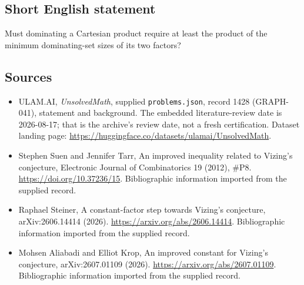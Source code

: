 \documentclass[11pt,a4paper]{article}
\begin{document}
\subsection{Short English statement}

Must dominating a Cartesian product require at least the product of the minimum dominating-set sizes of its two factors?

\subsection{Sources}

{\small

\begin{itemize}

\item[\hypertarget{source:1428:1}{S1}] ULAM.AI, \emph{UnsolvedMath}, supplied \texttt{problems.json}, record 1428 (GRAPH-041), statement and background. The embedded literature-review date is 2026-08-17; that is the archive’s review date, not a fresh certification. Dataset landing page: \url{https://huggingface.co/datasets/ulamai/UnsolvedMath}.

\item[\hypertarget{source:1428:2}{S2}] Stephen Suen and Jennifer Tarr, An improved inequality related to Vizing's conjecture, Electronic Journal of Combinatorics 19 (2012), \#P8. \url{https://doi.org/10.37236/15}. Bibliographic information imported from the supplied record.

\item[\hypertarget{source:1428:3}{S3}] Raphael Steiner, A constant-factor step towards Vizing's conjecture, arXiv:2606.14414 (2026). \url{https://arxiv.org/abs/2606.14414}. Bibliographic information imported from the supplied record.

\item[\hypertarget{source:1428:4}{S4}] Mohsen Aliabadi and Elliot Krop, An improved constant for Vizing's conjecture, arXiv:2607.01109 (2026). \url{https://arxiv.org/abs/2607.01109}. Bibliographic information imported from the supplied record.

\end{itemize}

}

\label{end:1428}
\end{document}
